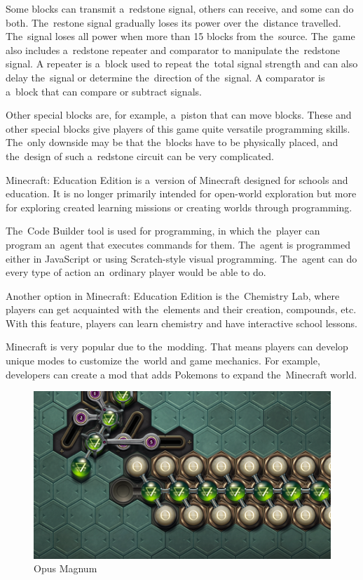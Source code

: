 Some blocks can transmit a~redstone signal, others can receive, and some can do both.
The~restone signal gradually loses its power over the~distance travelled.
The~signal loses all power when more than 15 blocks from the~source.
The~game also includes a~redstone repeater and comparator to manipulate the~redstone signal.
A repeater is a~block used to repeat the~total signal strength and can also delay the~signal or determine the~direction of the~signal.
A comparator is a~block that can compare or subtract signals.

\pagebreak
Other special blocks are, for example, a~piston that can move blocks.
These and other special blocks give players of this game quite versatile programming skills.
The~only downside may be that the~blocks have to be physically placed, and the~design of such a~redstone circuit can be very complicated.

Minecraft: Education Edition is a~version of Minecraft designed for schools and education.
It is no longer primarily intended for open-world exploration but more for exploring created learning missions or creating worlds through programming.

The~Code Builder tool is used for programming, in which the~player can program an~agent that executes commands for them.
The~agent is programmed either in JavaScript or using Scratch-style visual programming.
The~agent can do every type of action an~ordinary player would be able to do.

Another option in Minecraft: Education Edition is the~Chemistry Lab, where players can get acquainted with the~elements and their creation, compounds, etc.
With this feature, players can learn chemistry and have interactive school lessons.

Minecraft is very popular due to the~modding.
That means players can develop unique modes to customize the~world and game mechanics.
For example, developers can create a mod that adds Pokemons to expand the~Minecraft world.

\begin{figure}
    \centering
    \includegraphics[width=1\linewidth]{assets/similar-games/opusmagnum.png}
    \caption{Opus Magnum~\cite{a2022_zachtronics}}
    \label{fig:opusmagnum}
\end{figure}

